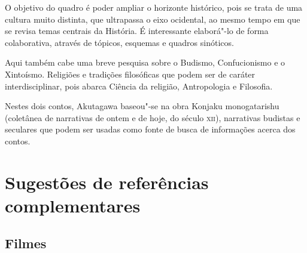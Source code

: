 \documentclass[12pt]{extarticle}
\begin{document}
O objetivo do quadro é poder ampliar o horizonte histórico, pois se trata de
uma cultura muito distinta, que ultrapassa o eixo ocidental, ao mesmo tempo em
que se revisa temas centrais da História. É interessante elaborá"-lo de forma
colaborativa, através de tópicos, esquemas e quadros sinóticos.

Aqui também cabe uma breve pesquisa sobre o Budismo, Confucionismo e o
Xintoísmo. Religiões e tradições filosóficas que podem ser de caráter
interdisciplinar, pois abarca Ciência da religião, Antropologia e Filosofia.

Nestes dois contos, Akutagawa baseou"-se na obra Konjaku monogatarishu
(coletânea de narrativas de ontem e de hoje, do século \textsc{xii}),
narrativas budistas e seculares que podem ser usadas como fonte de busca de
informações acerca dos contos.

\section{Sugestões de referências complementares}\label{sugestoes}

\subsection{Filmes}
\end{document}
